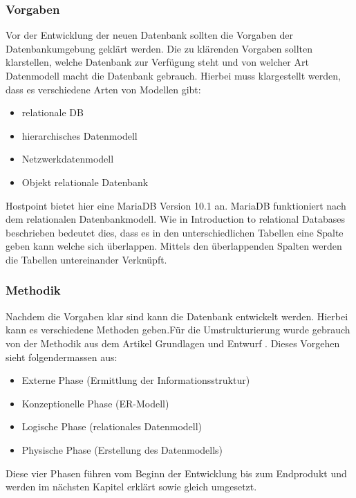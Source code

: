 \subsubsection{Vorgaben}
Vor der Entwicklung der neuen Datenbank sollten die Vorgaben der Datenbankumgebung geklärt werden. Die zu klärenden Vorgaben sollten klarstellen, welche Datenbank zur Verfügung steht und von welcher Art Datenmodell macht die Datenbank gebrauch. Hierbei muss klargestellt werden, dass es verschiedene Arten von Modellen gibt:
\begin{itemize}
\item relationale DB
\item hierarchisches Datenmodell
\item Netzwerkdatenmodell
\item Objekt relationale Datenbank
\end{itemize}

Hostpoint bietet hier eine MariaDB Version 10.1 an. MariaDB funktioniert nach dem relationalen Datenbankmodell. Wie in Introduction to relational Databases \cite{IntroductionToRelationalDatabases:MariaDB} beschrieben bedeutet dies, dass es in den unterschiedlichen Tabellen eine Spalte geben kann welche sich überlappen. Mittels den überlappenden Spalten werden die Tabellen untereinander Verknüpft.\\

\subsubsection{Methodik}
Nachdem die Vorgaben klar sind kann die Datenbank entwickelt werden. Hierbei kann es verschiedene Methoden geben.Für die Umstrukturierung wurde gebrauch von der Methodik aus dem Artikel Grundlagen und Entwurf \cite{Datenbanken:GrundlagenUndEntwurf:VeikkoKrypczyk}. Dieses Vorgehen sieht folgendermassen aus:
\begin{itemize}
\item Externe Phase (Ermittlung der Informationsstruktur)
\item Konzeptionelle Phase (ER-Modell)
\item Logische Phase (relationales Datenmodell)
\item Physische Phase (Erstellung des Datenmodells)
\end{itemize}

Diese vier Phasen führen vom Beginn der Entwicklung bis zum Endprodukt und werden im nächsten Kapitel erklärt sowie gleich umgesetzt.

